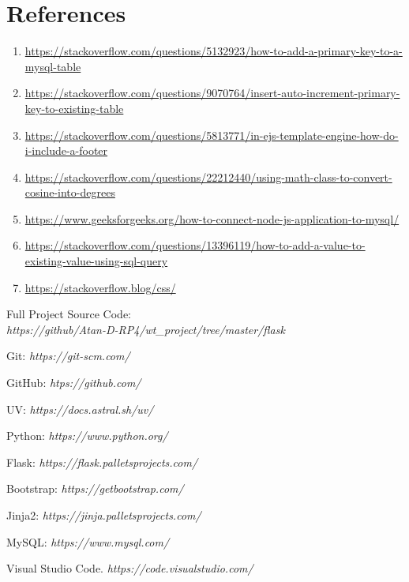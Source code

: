 \chapter{References}

\begin{enumerate}
    \item \raggedright \url{https://stackoverflow.com/questions/5132923/how-to-add-a-primary-key-to-a-mysql-table}
    \item \raggedright \url{https://stackoverflow.com/questions/9070764/insert-auto-increment-primary-key-to-existing-table}
    \item \raggedright \url{https://stackoverflow.com/questions/5813771/in-ejs-template-engine-how-do-i-include-a-footer}
    \item \raggedright \url{https://stackoverflow.com/questions/22212440/using-math-class-to-convert-cosine-into-degrees}
    \item \raggedright \url{https://www.geeksforgeeks.org/how-to-connect-node-js-application-to-mysql/}
    \item \raggedright \url{https://stackoverflow.com/questions/13396119/how-to-add-a-value-to-existing-value-using-sql-query}
    \item \raggedright \url{https://stackoverflow.blog/css/}
\end{enumerate}

\begin{thebibliography}{9}
    Full Project Source Code: \\
    \textit{https://github/Atan-D-RP4/wt\_project/tree/master/flask}

    Git: \textit{https://git-scm.com/}

    GitHub: \textit{htps://github.com/}

    UV: \textit{https://docs.astral.sh/uv/}

    Python: \textit{https://www.python.org/}

    Flask: \textit{https://flask.palletsprojects.com/}

    Bootstrap: \textit{https://getbootstrap.com/}

    Jinja2: \textit{https://jinja.palletsprojects.com/}

    MySQL: \textit{https://www.mysql.com/}

    Visual Studio Code. \textit{https://code.visualstudio.com/}
\end{thebibliography}

